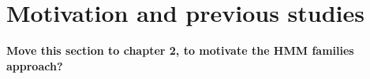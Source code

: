 \section{Motivation and previous studies}\label{sepp:motivation}
\textbf{Move this section to chapter 2, to motivate the HMM families approach?}
% 
% 
